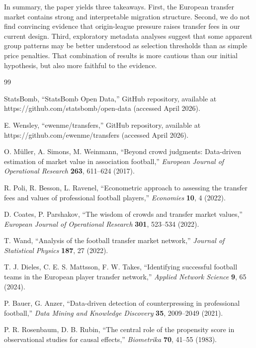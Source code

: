 \documentclass[12pt]{article}
\begin{document}
In summary, the paper yields three takeaways. First, the European transfer market contains strong and interpretable migration structure. Second, we do not find convincing evidence that origin-league pressure raises transfer fees in our current design. Third, exploratory metadata analyses suggest that some apparent group patterns may be better understood as selection thresholds than as simple price penalties. That combination of results is more cautious than our initial hypothesis, but also more faithful to the evidence.

\begin{thebibliography}{99}

StatsBomb, ``StatsBomb Open Data,'' GitHub repository, available at https://github.com/statsbomb/open-data (accessed April 2026).

E. Wensley, ``ewenme/transfers,'' GitHub repository, available at https://github.com/ewenme/transfers (accessed April 2026).

O. M\"uller, A. Simons, M. Weinmann, ``Beyond crowd judgments: Data-driven estimation of market value in association football,'' {\it European Journal of Operational Research\/} {\bf 263}, 611--624 (2017).

R. Poli, R. Besson, L. Ravenel, ``Econometric approach to assessing the transfer fees and values of professional football players,'' {\it Economies\/} {\bf 10}, 4 (2022).

D. Coates, P. Parshakov, ``The wisdom of crowds and transfer market values,'' {\it European Journal of Operational Research\/} {\bf 301}, 523--534 (2022).

T. Wand, ``Analysis of the football transfer market network,'' {\it Journal of Statistical Physics\/} {\bf 187}, 27 (2022).

T. J. Dieles, C. E. S. Mattsson, F. W. Takes, ``Identifying successful football teams in the European player transfer network,'' {\it Applied Network Science\/} {\bf 9}, 65 (2024).

P. Bauer, G. Anzer, ``Data-driven detection of counterpressing in professional football,'' {\it Data Mining and Knowledge Discovery\/} {\bf 35}, 2009--2049 (2021).

P. R. Rosenbaum, D. B. Rubin, ``The central role of the propensity score in observational studies for causal effects,'' {\it Biometrika\/} {\bf 70}, 41--55 (1983).


\end{thebibliography}
\end{document}
